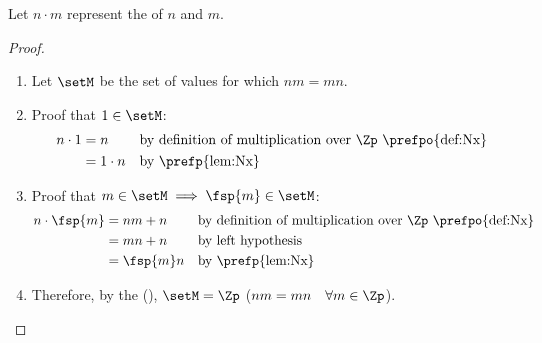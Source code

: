 \begin{theorem}
\label{thm:Nx_com}
Let $n\cdot m$ represent the  of $n$ and $m$.
\end{theorem}
\begin{proof}
  \begin{enumerate}
    \item Let $\setM$ be the set of values for which $nm=mn$.
    \item Proof that $1\in\setM$:
      \begin{align*}
        n\cdot1
          &= n
          && \text{by definition of multiplication over $\Zp$ \prefpo{def:Nx}}
        \\&= 1\cdot n
          && \text{by \prefp{lem:Nx}}
      \end{align*}

    \item Proof that $m\in\setM\implies\fsp{m}\in\setM$:
      \begin{align*}
        n\cdot\fsp{m}
          &= nm + n
          && \text{by definition of multiplication over $\Zp$ \prefpo{def:Nx}}
        \\&= mn + n
          && \text{by left hypothesis}
        \\&= \fsp{m}n
          && \text{by \prefp{lem:Nx}}
      \end{align*}

    \item Therefore, by the  (),
          $\setM=\Zp$ ($nm=mn \quad\forall m\in\Zp$).
  \end{enumerate}



\end{proof}


